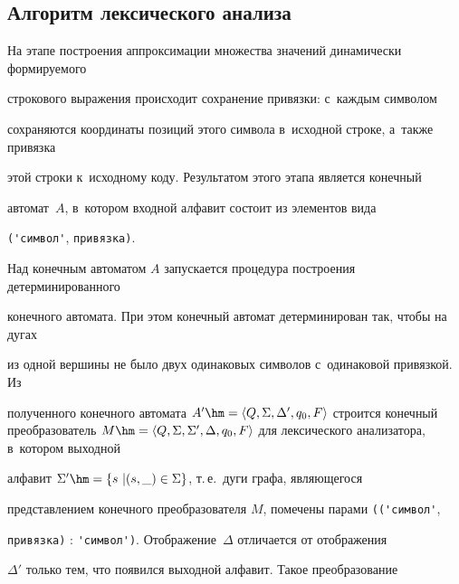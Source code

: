 \subsection{Алгоритм лексического анализа}





\vspace*{-2pt}





На этапе построения аппроксимации множества значений динамически формируемого 


строкового выражения происходит сохранение привязки: с~каждым символом 


сохраняются координаты позиций этого символа в~исходной строке, а~также привязка 


этой строки к~исходному коду. Результатом этого этапа является конечный 


автомат~$A$, в~котором входной алфавит состоит из элементов вида 


\verb"('символ'", \verb"привязка)".





\renewcommand{\figurename}{\protect\bf Рис.}


\setcounter{figure}{0}





Над конечным автоматом $A$ запускается процедура построения детерминированного 


конечного автомата. При этом конечный автомат детерминирован так, чтобы на дугах 


из одной вершины не было двух одинаковых символов с~одинаковой привязкой. Из 


полученного конечного автомата  $A' \hm= \langle Q, \Sigma, \Delta', q_0, F 


\rangle$ строится конечный преобразователь  $M \hm= \langle Q, \Sigma, \Sigma', 


\Delta, q_0, F \rangle$  для лексического анализатора, в~котором выходной 


алфавит $\Sigma'\hm= \{s~\vert (s,\_) \in \Sigma \}$, т.\,е.\ дуги графа, являющегося 


представлением конечного преобразователя $M$, помечены парами \verb"(('символ'", 


\verb"привязка)" : \verb"'символ')". Отображение~$\Delta$  отличается от отображения 


$\Delta'$ только тем, что появился выходной алфавит. Такое преобразование 


